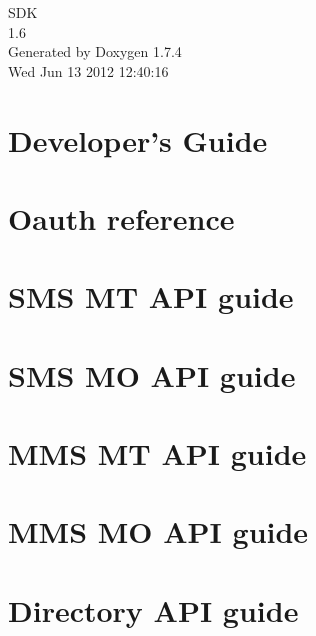 \documentclass[a4paper]{book}
\begin{document}
\hypersetup{pageanchor=false}
\begin{titlepage}
\vspace*{7cm}
\begin{center}
{\Large SDK \\[1ex]\large 1.6 }\\
\vspace*{1cm}
{\large Generated by Doxygen 1.7.4}\\
\vspace*{0.5cm}
{\small Wed Jun 13 2012 12:40:16}\\
\end{center}
\end{titlepage}
\clearemptydoublepage
{}
\tableofcontents
\clearemptydoublepage
{}
\hypersetup{pageanchor=true}
\chapter{Developer's Guide}
\label{index}\hypertarget{index}{}
\chapter{Oauth reference}
\label{blv_oauth_guide}
\hypertarget{blv_oauth_guide}{}

\chapter{SMS MT API guide}
\label{blv_sms_mt_guide}
\hypertarget{blv_sms_mt_guide}{}

\chapter{SMS MO API guide}
\label{blv_sms_mo_guide}
\hypertarget{blv_sms_mo_guide}{}

\chapter{MMS MT API guide}
\label{blv_mms_mt_guide}
\hypertarget{blv_mms_mt_guide}{}

\chapter{MMS MO API guide}
\label{blv_mms_mo_guide}
\hypertarget{blv_mms_mo_guide}{}

\chapter{Directory API guide}
\label{blv_directory_guide}
\hypertarget{blv_directory_guide}{}

\end{document}
